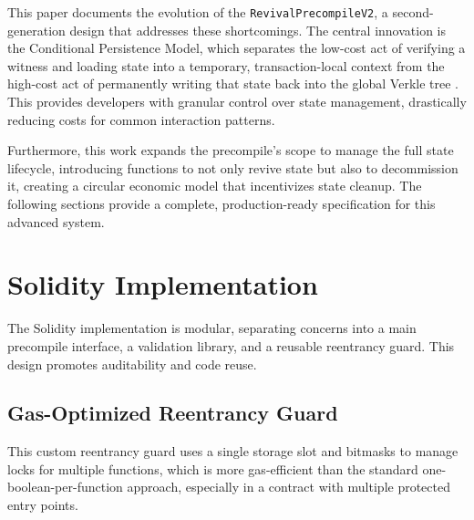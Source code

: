 \documentclass{article}
\begin{document}
This paper documents the evolution of the \texttt{RevivalPrecompileV2}, a second-generation design that addresses these shortcomings. The central innovation is the Conditional Persistence Model, which separates the low-cost act of verifying a witness and loading state into a temporary, transaction-local context from the high-cost act of permanently writing that state back into the global Verkle tree \cite{ethereum_verkle_2025}. This provides developers with granular control over state management, drastically reducing costs for common interaction patterns.

Furthermore, this work expands the precompile's scope to manage the full state lifecycle, introducing functions to not only revive state but also to decommission it, creating a circular economic model that incentivizes state cleanup. The following sections provide a complete, production-ready specification for this advanced system.

\section{Solidity Implementation}

The Solidity implementation is modular, separating concerns into a main precompile interface, a validation library, and a reusable reentrancy guard. This design promotes auditability and code reuse.

\subsection{Gas-Optimized Reentrancy Guard}

This custom reentrancy guard uses a single storage slot and bitmasks to manage locks for multiple functions, which is more gas-efficient than the standard one-boolean-per-function approach, especially in a contract with multiple protected entry points.
\end{document}

